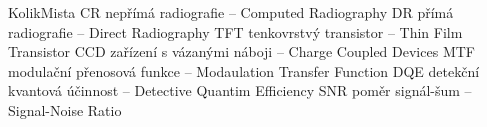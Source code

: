 \begin{seznamzkratek}{KolikMista}
			{CR}
			{nepřímá radiografie -- Computed Radiography}
			{DR}
			{přímá radiografie -- Direct Radiography}
			{TFT}
			{tenkovrstvý transistor -- Thin Film Transistor}
			{CCD}
			{zařízení s vázanými náboji -- Charge Coupled Devices}
			{MTF}
			{modulační přenosová funkce -- Modaulation Transfer Function}
			{DQE}
			{detekční kvantová účinnost -- Detective Quantim Efficiency}
			{SNR}
			{poměr signál-šum -- Signal-Noise Ratio}
\end{seznamzkratek}
